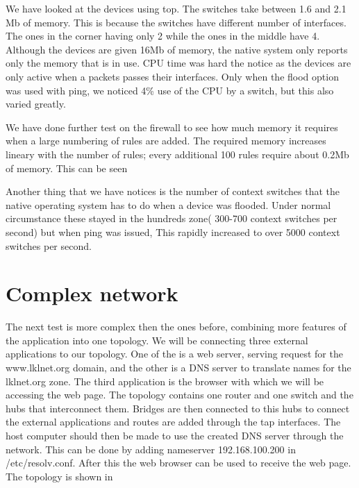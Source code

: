 We have looked at the devices using top. The switches take between 1.6 and 2.1 Mb of memory. This is
because the switches have different number of interfaces. The ones in the corner having only 2 while
the ones in the middle have 4. Although the devices are given 16Mb of memory, the native system
only reports only the memory that is in use. CPU time was hard the notice as the devices are only active
when a packets passes their interfaces. Only when the flood option was used with ping, we noticed
4\% use of the CPU by a switch, but this also varied greatly. 

We have done further test on the firewall to see how much memory it requires when a large numbering
of rules are added. The required memory increases lineary with the number of rules; every additional
100 rules require about 0.2Mb of memory. This can be seen 

Another thing that we have notices is the number of context switches that the native operating
system has to do when a device was flooded. Under normal circumstance these stayed in the hundreds
zone( 300-700 context switches per second) but when ping was issued, This rapidly increased to over
5000 context switches per second.


\section{Complex network}
\label{sec:complex-network}

The next test is more complex then the ones before, combining more features of the application into
one topology. We will be connecting three external applications to our \textbf{\project} topology. One of
the is a web server, serving request for the www.lklnet.org domain, and the other is a DNS server to
translate names for the lklnet.org zone. The third application is the browser with which we will
be accessing the web page. The \textbf{\project} topology contains one router and one switch and the hubs
that interconnect them. Bridges are then connected to this hubs to connect the external applications and
routes are added through the tap interfaces. The host computer should then be made to use the created
DNS server through the \textbf{\project} network. This can be done by adding nameserver 192.168.100.200
in /etc/resolv.conf. After this the web browser can be used to receive the web page. The topology is shown
in 

